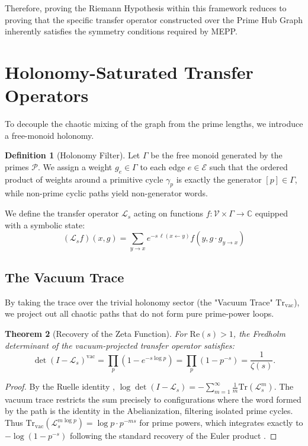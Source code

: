 \documentclass[12pt,a4paper]{article}
\newtheorem{theorem}{Theorem}[section]
\theoremstyle{definition}
\newtheorem{definition}[theorem]{Definition}
\theoremstyle{remark}
\begin{document}
Therefore, proving the Riemann Hypothesis within this framework reduces to proving that the specific transfer operator constructed over the Prime Hub Graph inherently satisfies the symmetry conditions required by MEPP. 

\section{Holonomy-Saturated Transfer Operators}

To decouple the chaotic mixing of the graph from the prime lengths, we introduce a free-monoid holonomy.

\begin{definition}[Holonomy Filter]
Let $\Gamma$ be the free monoid generated by the primes $\mathcal{P}$. We assign a weight $g_e \in \Gamma$ to each edge $e \in \mathcal{E}$ such that the ordered product of weights around a primitive cycle $\gamma_p$ is exactly the generator $[p] \in \Gamma$, while non-prime cyclic paths yield non-generator words.
\end{definition}

We define the transfer operator $\mathcal{L}_s$ acting on functions $f: \mathcal{V} \times \Gamma \to \mathbb{C}$ equipped with a symbolic state:
\[
(\mathcal{L}_s f)(x, g) = \sum_{y \to x} e^{-s\,\ell(x \leftarrow y)} f(y, g \cdot g_{y \to x})
\]

\subsection{The Vacuum Trace}

By taking the trace over the trivial holonomy sector (the "Vacuum Trace" $\text{Tr}_{\text{vac}}$), we project out all chaotic paths that do not form pure prime-power loops.

\begin{theorem}[Recovery of the Zeta Function]
For $\text{Re}(s) > 1$, the Fredholm determinant of the vacuum-projected transfer operator satisfies:
\[
\det(I - \mathcal{L}_s)^{\text{vac}} = \prod_p \left(1 - e^{-s \log p}\right) = \prod_p \left(1 - p^{-s}\right) = \frac{1}{\zeta(s)}.
\]
\end{theorem}

\begin{proof}
By the Ruelle identity \cite{Ruelle1976}, $\log \det(I - \mathcal{L}_s) = -\sum_{m=1}^\infty \frac{1}{m} \text{Tr}(\mathcal{L}_s^m)$. The vacuum trace restricts the sum precisely to configurations where the word formed by the path is the identity in the Abelianization, filtering isolated prime cycles. Thus $\text{Tr}_{\text{vac}}(\mathcal{L}_s^{m \log p}) = \log p \cdot p^{-ms}$ for prime powers, which integrates exactly to $-\log(1 - p^{-s})$ following the standard recovery of the Euler product \cite{Riemann1859}.
\end{proof}
\end{document}
